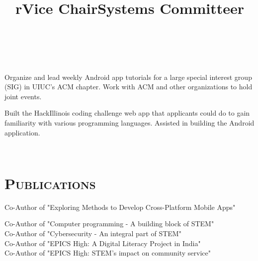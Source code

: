 \begin{resume}
\begin{formatb}
  \title{r}\\
  \body\\
\end{formatb}

\title{Vice Chair}
\begin{position}
Organize and lead weekly Android app tutorials for a large special interest group (SIG) in UIUC's ACM chapter. Work with ACM and other organizations to hold joint events.
\end{position}

\title{Systems Committee}
\begin{position}
Built the HackIllinois coding challenge web app that applicants could do to gain familiarity with various programming languages. Assisted in building the Android application.
\end{position}

\begin{formatb}
  \title{r}\\
\end{formatb}

\section{\textsc{Publications}}

\title{}
\begin{position}
Co-Author of "Exploring Methods to Develop Cross-Platform Mobile Apps"
\end{position}

\title{}
\begin{position}
Co-Author of "Computer programming - A building block of STEM" \\
Co-Author of "Cybersecurity - An integral part of STEM" \\
Co-Author of "EPICS High: A Digital Literacy Project in India" \\
Co-Author of "EPICS High: STEM's impact on community service"
\end{position}

\end{resume}

